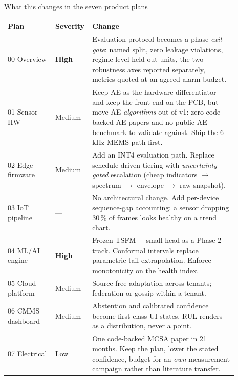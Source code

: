 \documentclass[aspectratio=169,10pt]{beamer}
\begin{document}
\begin{frame}{What this changes in the seven product plans}
  \scriptsize
  \begin{tabular}{@{}p{0.2\linewidth}p{0.075\linewidth}p{0.615\linewidth}@{}}
    \toprule
    \textbf{Plan} & \textbf{Severity} & \textbf{Change} \\
    \midrule
    00 Overview & \textcolor{pdmcrit}{\textbf{High}} &
      Evaluation protocol becomes a phase-\emph{exit gate}: named split, zero
      leakage violations, regime-level held-out units, the two robustness axes
      reported separately, metrics quoted at an agreed alarm budget. \\[0.8mm]
    01 Sensor HW & Medium &
      Keep AE as the hardware differentiator and keep the front-end on the PCB,
      but move AE \emph{algorithms} out of v1: zero code-backed AE papers and no
      public AE benchmark to validate against. Ship the 6\,kHz MEMS path first. \\[0.8mm]
    02 Edge firmware & Medium &
      Add an INT4 evaluation path. Replace schedule-driven tiering with
      \emph{uncertainty-gated} escalation (cheap indicators $\to$ spectrum $\to$
      envelope $\to$ raw snapshot). \\[0.8mm]
    03 IoT pipeline & --- &
      No architectural change. Add per-device sequence-gap accounting: a sensor
      dropping 30\,\% of frames looks healthy on a trend chart. \\[0.8mm]
    04 ML/AI engine & \textcolor{pdmcrit}{\textbf{High}} &
      Frozen-TSFM + small head as a Phase-2 track. Conformal intervals replace
      parametric tail extrapolation. Enforce monotonicity on the health index. \\[0.8mm]
    05 Cloud platform & Medium &
      Source-free adaptation across tenants; federation or gossip within a
      tenant. \\[0.8mm]
    06 CMMS dashboard & Medium &
      Abstention and calibrated confidence become first-class UI states. RUL
      renders as a distribution, never a point. \\[0.8mm]
    07 Electrical & Low &
      One code-backed MCSA paper in 21 months. Keep the plan, lower the stated
      confidence, budget for an \emph{own} measurement campaign rather than
      literature transfer. \\
    \bottomrule
  \end{tabular}
\end{frame}
\end{document}
